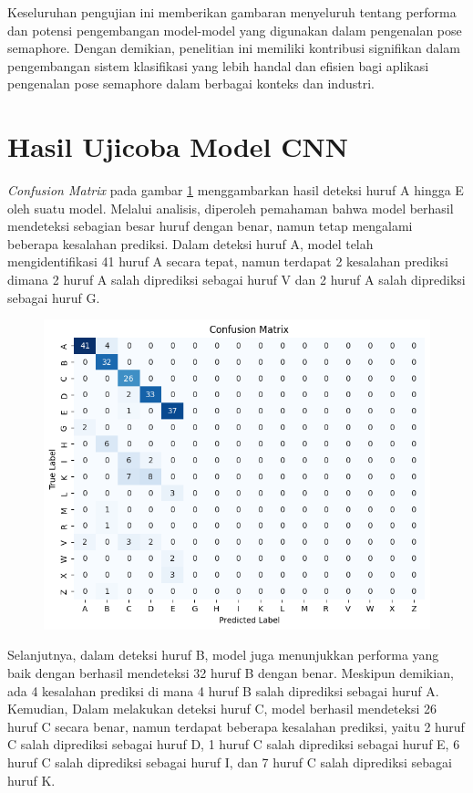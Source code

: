 Keseluruhan pengujian ini memberikan gambaran menyeluruh tentang performa dan potensi pengembangan model-model yang digunakan dalam pengenalan pose semaphore. Dengan demikian, penelitian ini memiliki kontribusi signifikan dalam pengembangan sistem klasifikasi yang lebih handal dan efisien bagi aplikasi pengenalan pose semaphore dalam berbagai konteks dan industri.

\section{Hasil Ujicoba Model CNN}
\textit{Confusion Matrix} pada gambar \ref{fig:HasilUjicobaCNN} menggambarkan hasil deteksi huruf A hingga E oleh suatu model. Melalui analisis, diperoleh pemahaman bahwa model berhasil mendeteksi sebagian besar huruf dengan benar, namun tetap mengalami beberapa kesalahan prediksi. Dalam deteksi huruf A, model telah mengidentifikasi 41 huruf A secara tepat, namun terdapat 2 kesalahan prediksi dimana 2 huruf A salah diprediksi sebagai huruf V dan 2 huruf A salah diprediksi sebagai huruf G.

\begin{figure}[!hbt]
	\centering
	\includegraphics[width=0.7\linewidth]{gambar/bener/ConfusionMatrix-Ujicoba-CNN.png}
	\label{fig:HasilUjicobaCNN}
\end{figure}

Selanjutnya, dalam deteksi huruf B, model juga menunjukkan performa yang baik dengan berhasil mendeteksi 32 huruf B dengan benar. Meskipun demikian, ada 4 kesalahan prediksi di mana 4 huruf B salah diprediksi sebagai huruf A. Kemudian, Dalam melakukan deteksi huruf C, model berhasil mendeteksi 26 huruf C secara benar, namun terdapat beberapa kesalahan prediksi, yaitu 2 huruf C salah diprediksi sebagai huruf D, 1 huruf C salah diprediksi sebagai huruf E, 6 huruf C salah diprediksi sebagai huruf I, dan 7 huruf C salah diprediksi sebagai huruf K.

